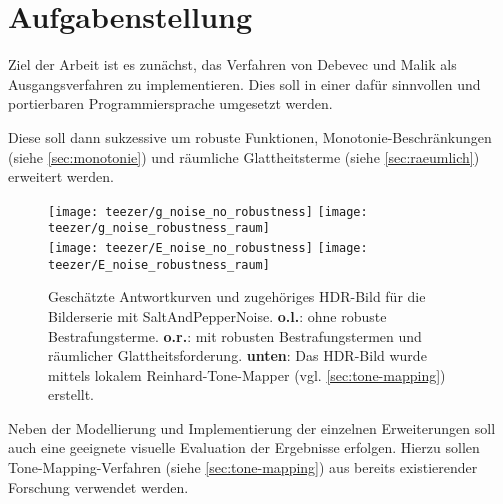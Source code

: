 \section{Aufgabenstellung}
Ziel der Arbeit ist es zunächst, das Verfahren von Debevec und Malik \cite{paper} als Ausgangsverfahren zu implementieren. Dies soll in einer dafür sinnvollen und portierbaren Programmiersprache umgesetzt werden.

Diese  soll dann sukzessive um robuste Funktionen, \gls{Monotonie}-Beschränkungen (siehe \autoref{sec:monotonie}) und räumliche Glattheitsterme (siehe \autoref{sec:raeumlich}) erweitert werden.

\begin{figure}[H]
  \begin{center}
    \texttt{[image: teezer/g\_noise\_no\_robustness]}
    \texttt{[image: teezer/g\_noise\_robustness\_raum]}
    \\
    \vspace{3pt}
    \texttt{[image: teezer/E\_noise\_no\_robustness]}
    \texttt{[image: teezer/E\_noise\_robustness\_raum]}
    \caption{Geschätzte Antwortkurven und zugehöriges HDR-Bild für die Bilderserie \cite{tellone} mit \gls{SaltAndPepperNoise}. \textbf{o.l.}: ohne robuste Bestrafungsterme. \textbf{o.r.}: mit robusten Bestrafungstermen und räumlicher Glattheitsforderung. \textbf{unten}: Das HDR-Bild wurde mittels lokalem Reinhard-Tone-Mapper (vgl. \autoref{sec:tone-mapping}) erstellt.}
    \label{fig:teezer}
  \end{center}
\end{figure}


Neben der Modellierung und Implementierung der einzelnen Erweiterungen soll auch eine geeignete visuelle Evaluation der Ergebnisse erfolgen. Hierzu sollen \gls{Tone-Mapping}-Verfahren (siehe \autoref{sec:tone-mapping}) aus bereits existierender Forschung verwendet werden. 



